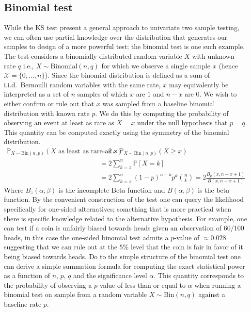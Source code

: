 \subsection*{Binomial test} While the KS test present a general approach to univariate two sample testing, we can often use partial knowledge over the distribution that generates our samples to design of a more powerful test;
the binomial test is one such example.
The test considers a binomially distributed random variable $X$ with unknown rate $q$ i.e., $X\sim \text{Binomial}(n, q)$ for which we observe a single sample $x$ (hence $\mathcal{X}=\{0,\ldots, n\}$).
Since the binomial distribution is defined as a sum of i.i.d.\ Bernoulli random variables with the same rate, $x$ may equivalently be interpreted as a set of $n$ samples of which $x$ are $1$ and $n-x$ are $0$.
We wish to either confirm or rule out that $x$ was sampled from a baseline binomial distribution with known rate $p$.
We do this by computing the probability of observing an event at least as rare as $X=x$ under the null hypothesis that $p=q$.
This quantity can be computed exactly using the symmetry of the binomial distribution.
\begin{align*}
    \mathbb{P}_{X\sim \text{Bin}(n, p)}(X \text{ as least as rare as } x) &= 2\times \mathbb{P}_{X\sim \text{Bin}(n, p)}(X \geq x)\\
    &= 2 \sum_{k=x}^{n} \mathbb{P}[X=k] \\
    &= 2 \sum _{k=x}^n (1-p)^{n-k} p^k \binom{n}{k} = 2\frac{B_p(x,n-x+1)}{B(x,n-x+1)}
\end{align*}
Where $B_z(\alpha, \beta)$ is the incomplete Beta function and $B(\alpha, \beta)$ is the beta function.
By the convenient construction of the test one can query the likelihood specifically for one-sided alternatives;
something that is more practical when there is specific knowledge related to the alternative hypothesis.
For example, one can test if a coin is unfairly biased towards heads given an observation of $60/100$ heads, in this case the one-sided binomial test admits a $p$-value of $\approx 0.028$ suggesting that we can rule out at the $5\%$ level that the coin is fair
in favor of it being biased towards heads.
\smallbreak
Do to the simple structure of the binomial test one can derive a simple summation formula for computing the
exact statistical power as a function of $n$, $p$, $q$ and the significance level $\alpha$.
This quantity corresponds to the probability of observing a $p$-value of less than or equal to $\alpha$ when running a
binomial test on sample from a random variable $X\sim \text{Bin}(n,q)$ against a baseline rate $p$.
